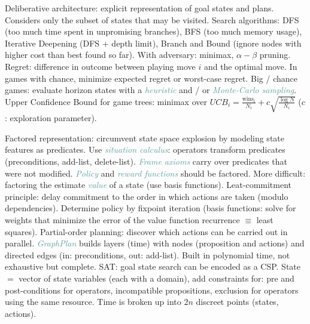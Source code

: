 \documentclass[10pt,a4paper,landscape]{article}
\newcommand{\concept}[1]{\textcolor{Emerald}{#1}} %
\newcommand{\subconcept}[1]{\textcolor{CadetBlue}{\textit{#1}}}
\renewcommand{\section}[1]{
    \vspace{-0.3cm}
    \begin{center}
      \color{Bittersweet}
      \hrulefill{\small~~#1~~}\hrulefill
    \end{center}
    \vspace{-0.3cm}
  }
\begin{document}
\begin{multicols*}{4}
\concept{Deliberative architecture}: explicit representation of goal states and plans. Considers only the subset of states that may be visited.
\concept{Search algorithms}: DFS (too much time spent in unpromising branches), BFS (too much memory usage), Iterative Deepening (DFS + depth limit), Branch and Bound (ignore nodes with higher cost than best found so far). With adversary: minimax, $\alpha-\beta$ pruning.
\concept{Regret}: difference in outcome between playing move $i$ and the optimal move. In games with chance, minimize expected regret or worst-case regret.
Big / chance games: evaluate horizon states with a \subconcept{heuristic} and / or \subconcept{Monte-Carlo sampling}.
\concept{Upper Confidence Bound} for game trees: minimax over $UCB_i = \frac{\text{wins}_i}{N_i} + c \sqrt{\frac{\log{N}}{N_i}}$ ($c$: exploration parameter).

\concept{Factored representation}: circumvent state space explosion by modeling state features as predicates. Use \subconcept{situation calculus}: operators transform predicates (preconditions, add-list, delete-list). \subconcept{Frame axioms} carry over predicates that were not modified.
\subconcept{Policy} and \subconcept{reward functions} should be factored. More difficult: factoring the estimate \subconcept{value} of a state (use basis functions).
\concept{Leat-commitment principle}: delay commitment to the order in which actions are taken (modulo dependencies). Determine policy by fixpoint iteration (basis functions: solve for weights that minimize the error of the value function recurrence $\equiv$ least squares).
\concept{Partial-order planning}: discover which actions can be carried out in parallel.
\subconcept{GraphPlan} builds layers (time) with nodes (proposition and actions) and directed edges (in: preconditions, out: add-list). Built in polynomial time, not exhaustive but complete.
\concept{SAT}: goal state search can be encoded as a CSP. State $=$ vector of state variables (each with a domain), add constraints for: pre and post-conditions for operators, incompatible propositions, exclusion for operators using the same resource. Time is broken up into $2n$ discreet points (states, actions).

\section{Multiagent systems}


\end{multicols*}
\end{document}
